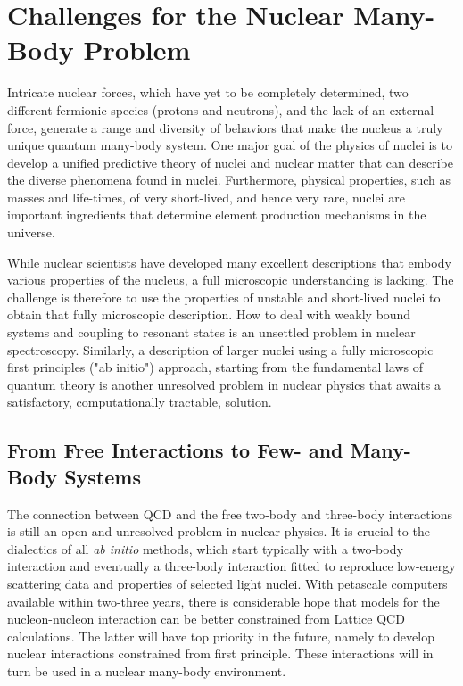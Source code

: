  
\section{Challenges for the Nuclear Many-Body Problem} 

Intricate nuclear forces, which
have yet to be completely determined, two different fermionic species 
(protons and neutrons), and the lack of an external force, generate a
range and diversity of behaviors that make the nucleus a truly unique 
quantum many-body system. One major goal of the physics of nuclei is to
develop a unified predictive theory of nuclei and nuclear matter 
that can describe the diverse phenomena found in nuclei. 
Furthermore, physical properties, such as masses and life-times,
of very short-lived, and hence very rare, nuclei are important
ingredients that determine element production mechanisms in
the universe. 

While nuclear scientists have developed many excellent descriptions
that embody various properties of the nucleus, a full microscopic
understanding is lacking. The challenge is therefore to use 
the properties of unstable and short-lived nuclei to obtain that
fully microscopic description. How to deal with weakly
bound systems and coupling to resonant states is an unsettled problem in
nuclear spectroscopy. Similarly,  a description of  larger nuclei using a
fully microscopic first principles ("ab initio") approach, starting from the
fundamental laws of quantum theory is another unresolved problem
in nuclear physics that awaits a satisfactory, computationally tractable,
solution.


\subsection{From Free Interactions to Few- and Many-Body Systems}  

The connection between QCD and the free two-body and three-body interactions
is still an open and unresolved problem in nuclear physics. 
It is crucial to the dialectics of all {\it ab initio} methods, which start 
typically with a two-body interaction and eventually a three-body interaction 
fitted to reproduce low-energy scattering data and properties
of selected light nuclei. 
With petascale computers available within two-three years, there is considerable hope that
models for the nucleon-nucleon interaction can be better constrained from Lattice QCD calculations.
The latter will have  top priority in the future, namely to develop nuclear interactions constrained from
first principle.  These interactions will in turn be used in a nuclear many-body environment.

